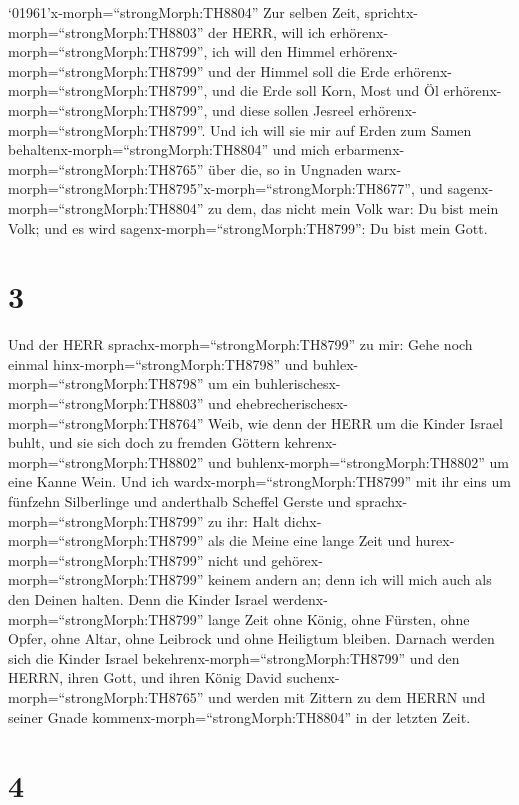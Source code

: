 `01961'\textbar x-morph=``strongMorph:TH8804'' Zur selben Zeit,
sprichtx-morph=``strongMorph:TH8803'' der HERR, will ich
erhörenx-morph=``strongMorph:TH8799'', ich will den Himmel
erhörenx-morph=``strongMorph:TH8799'' und der Himmel soll die Erde
erhörenx-morph=``strongMorph:TH8799'',  und die Erde soll
Korn, Most und Öl erhörenx-morph=``strongMorph:TH8799'', und diese
sollen Jesreel erhörenx-morph=``strongMorph:TH8799''.  Und
ich will sie mir auf Erden zum Samen
behaltenx-morph=``strongMorph:TH8804'' und mich
erbarmenx-morph=``strongMorph:TH8765'' über die, so in Ungnaden
warx-morph=``strongMorph:TH8795''\textbar x-morph=``strongMorph:TH8677'',
und sagenx-morph=``strongMorph:TH8804'' zu dem, das nicht mein Volk war:
Du bist mein Volk; und es wird sagenx-morph=``strongMorph:TH8799'': Du
bist mein Gott.

\hypertarget{section-2}{%
\section{3}\label{section-2}}

 Und der HERR sprachx-morph=``strongMorph:TH8799'' zu mir:
Gehe noch einmal hinx-morph=``strongMorph:TH8798'' und
buhlex-morph=``strongMorph:TH8798'' um ein
buhlerischesx-morph=``strongMorph:TH8803'' und
ehebrecherischesx-morph=``strongMorph:TH8764'' Weib, wie denn der HERR
um die Kinder Israel buhlt, und sie sich doch zu fremden Göttern
kehrenx-morph=``strongMorph:TH8802'' und
buhlenx-morph=``strongMorph:TH8802'' um eine Kanne Wein. 
Und ich wardx-morph=``strongMorph:TH8799'' mit ihr eins um fünfzehn
Silberlinge und anderthalb Scheffel Gerste  und
sprachx-morph=``strongMorph:TH8799'' zu ihr: Halt
dichx-morph=``strongMorph:TH8799'' als die Meine eine lange Zeit und
hurex-morph=``strongMorph:TH8799'' nicht und
gehörex-morph=``strongMorph:TH8799'' keinem andern an; denn ich will
mich auch als den Deinen halten.  Denn die Kinder Israel
werdenx-morph=``strongMorph:TH8799'' lange Zeit ohne König, ohne
Fürsten, ohne Opfer, ohne Altar, ohne Leibrock und ohne Heiligtum
bleiben.  Darnach werden sich die Kinder Israel
bekehrenx-morph=``strongMorph:TH8799'' und den HERRN, ihren Gott, und
ihren König David suchenx-morph=``strongMorph:TH8765'' und werden mit
Zittern zu dem HERRN und seiner Gnade
kommenx-morph=``strongMorph:TH8804'' in der letzten Zeit.

\hypertarget{section-3}{%
\section{4}\label{section-3}}

